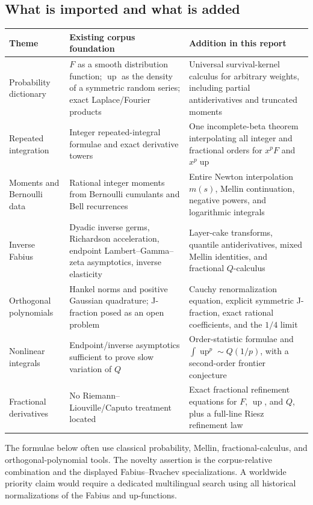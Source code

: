 \documentclass[11pt,oneside]{article}
\theoremstyle{definition}
\theoremstyle{remark}
\newcommand{\Up}{\operatorname{up}}
\newcommand{\1}{\mathbf 1}
\begin{document}
\subsection{What is imported and what is added}

\begin{center}
\small
\begin{tabularx}{0.98\textwidth}{@{}p{}X X@{}}
\toprule
Theme & Existing corpus foundation & Addition in this report \\
\midrule
Probability dictionary
& \(F\) as a smooth distribution function; \(\Up\) as the density of a
symmetric random series; exact Laplace/Fourier products
& Universal survival-kernel calculus for arbitrary weights, including partial
antiderivatives and truncated moments \\
Repeated integration
& Integer repeated-integral formulae and exact derivative towers
& One incomplete-beta theorem interpolating all integer and fractional orders
for \(x^pF\) and \(x^p\Up\) \\
Moments and Bernoulli data
& Rational integer moments from Bernoulli cumulants and Bell recurrences
& Entire Newton interpolation \(m(s)\), Mellin continuation, negative powers,
and logarithmic integrals \\
Inverse Fabius
& Dyadic inverse germs, Richardson acceleration, endpoint Lambert--Gamma--zeta
asymptotics, inverse elasticity
& Layer-cake transforms, quantile antiderivatives, mixed Mellin identities, and
fractional \(Q\)-calculus \\
Orthogonal polynomials
& Hankel norms and positive Gaussian quadrature; J-fraction posed as an open
problem
& Cauchy renormalization equation, explicit symmetric J-fraction, exact rational
coefficients, and the \(1/4\) limit \\
Nonlinear integrals
& Endpoint/inverse asymptotics sufficient to prove slow variation of \(Q\)
& Order-statistic formulae and \(\int\Up^p\sim Q(1/p)\), with a second-order
frontier conjecture \\
Fractional derivatives
& No Riemann--Liouville/Caputo treatment located
& Exact fractional refinement equations for \(F\), \(\Up\), and \(Q\), plus a
full-line Riesz refinement law \\
\bottomrule
\end{tabularx}
\end{center}

\begin{remark}
The formulae below often use classical probability, Mellin, fractional-calculus,
and orthogonal-polynomial tools.  The novelty assertion is the corpus-relative
combination and the displayed Fabius--Rvachev specializations.  A worldwide
priority claim would require a dedicated multilingual search using all historical
normalizations of the Fabius and up-functions.
\end{remark}
\end{document}
